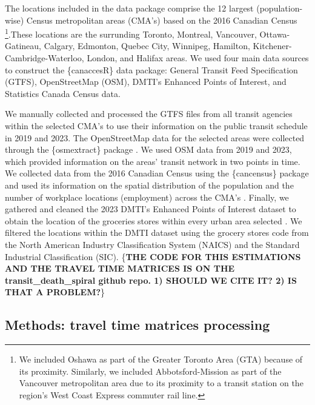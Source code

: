 \documentclass[Royal,times,sageh]{sagej}
\begin{document}
The locations included in the data package comprise the 12 largest
(population-wise) Census metropolitan areas (CMA's) based on the 2016
Canadian Census \citep{governmentofcanada2016CensusPopulation2016}
\footnote{We included Oshawa as part of the Greater Toronto Area (GTA)
  because of its proximity. Similarly, we included Abbotsford-Mission as
  part of the Vancouver metropolitan area due to its proximity to a
  transit station on the region's West Coast Express commuter rail line.}.These
locations are the surrunding Toronto, Montreal, Vancouver,
Ottawa-Gatineau, Calgary, Edmonton, Quebec City, Winnipeg, Hamilton,
Kitchener-Cambridge-Waterloo, London, and Halifax areas. We used four
main data sources to construct the \{canaccesR\} data package: General
Transit Feed Specification (GTFS), OpenStreetMap (OSM), DMTI's Enhanced
Points of Interest, and Statistics Canada Census data.

We manually collected and processed the GTFS files from all transit
agencies within the selected CMA's to use their information on the
public transit schedule in 2019 and 2023. The OpenStreetMap data for the
selected areas were collected through the \{osmextract\} package
\citep{gilardiOsmextractDownloadImport2025}. We used OSM data from 2019
and 2023, which provided information on the areas' transit network in
two points in time. We collected data from the 2016 Canadian Census
using the \{cancensus\} package
\citep{vonbergmannCancensusPackageAccess2022} and used its information
on the spatial distribution of the population and the number of
workplace locations (employment) across the CMA's
\citep{governmentofcanada2016CensusPopulation2016}. Finally, we gathered
and cleaned the 2023 DMTI's Enhanced Points of Interest dataset to
obtain the location of the groceries stores within every urban area
selected \citep{dmtispatialincEnhancedPointsInterest2015}. We filtered
the locations within the DMTI dataset using the grocery stores code from
the North American Industry Classification System (NAICS) and the
Standard Industrial Classification (SIC). \{\textbf{THE CODE FOR THIS
ESTIMATIONS AND THE TRAVEL TIME MATRICES IS ON THE
transit\_death\_spiral github repo. 1) SHOULD WE CITE IT? 2) IS THAT A
PROBLEM?}\}

\subsection{Methods: travel time matrices
processing}\label{methods-travel-time-matrices-processing}
\end{document}
